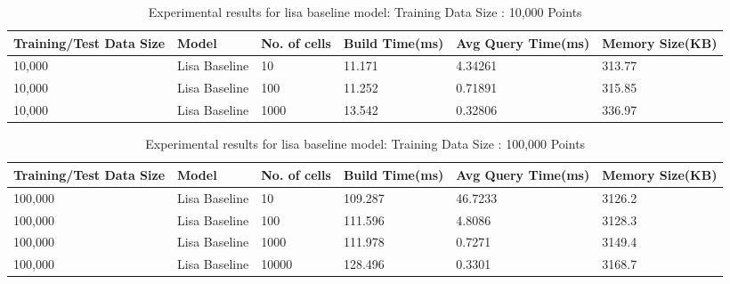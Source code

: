 \begin{table}[ht]
	\centering
	\begin{tabular}{||p{}<{\centering}|p{}<{\centering}| p{}<{\centering}|p{}<{\centering}|p{}<{\centering}|p{}<{\centering}||}
		\hline
		Training/Test Data Size& Model & No. of cells & Build Time(ms) & Avg Query Time(ms) & Memory Size(KB)\\ [0.5ex] 
		\hline
		\hline
		10,000& Lisa Baseline & 10 & 11.171 & 4.34261 & 313.77\\
		\hline
		10,000& Lisa Baseline & 100 & 11.252 & 0.71891 & 315.85\\
		\hline
		10,000& Lisa Baseline & 1000 & 13.542 & 0.32806 & 336.97\\
		\hline
		\hline
	\end{tabular}
    \label{small_lognormal_lisa_baseline_10000}
	\caption{Experimental results for lisa baseline model: Training Data Size : 10,000 Points}
\end{table}
\begin{table}[ht]
	\centering
	\begin{tabular}{||p{}<{\centering}|p{}<{\centering}| p{}<{\centering}|p{}<{\centering}|p{}<{\centering}|p{}<{\centering}||}
		\hline
		Training/Test Data Size& Model & No. of cells & Build Time(ms) & Avg Query Time(ms) & Memory Size(KB)\\ [0.5ex] 
		\hline
		\hline
		100,000& Lisa Baseline & 10 & 109.287 & 46.7233 & 3126.2\\
		\hline
		100,000& Lisa Baseline & 100 & 111.596 & 4.8086 & 3128.3\\
		\hline
		100,000& Lisa Baseline & 1000 & 111.978 & 0.7271 & 3149.4\\
		\hline
		100,000& Lisa Baseline & 10000 & 128.496 & 0.3301 & 3168.7\\
		\hline
		\hline
	\end{tabular}
    \label{small_lognormal_lisa_baseline_10000}
	\caption{Experimental results for lisa baseline model: Training Data Size : 100,000 Points}
\end{table}

